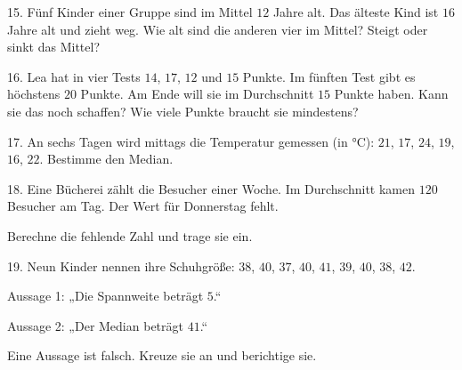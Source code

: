 \documentclass[11pt]{article}
\begin{document}
\begin{pfaufg}{}{15.}{}
Fünf Kinder einer Gruppe sind im Mittel $12$ Jahre alt. Das älteste Kind ist $16$ Jahre alt und zieht weg. Wie alt sind die anderen vier im Mittel? Steigt oder sinkt das Mittel?
\end{pfaufg}

\begin{pfaufg}{}{16.}{}
Lea hat in vier Tests $14$, $17$, $12$ und $15$ Punkte. Im fünften Test gibt es höchstens $20$ Punkte. Am Ende will sie im Durchschnitt $15$ Punkte haben. Kann sie das noch schaffen? Wie viele Punkte braucht sie mindestens?
\end{pfaufg}

\begin{pfaufg}{}{17.}{}
An sechs Tagen wird mittags die Temperatur gemessen (in °C): $21$, $17$, $24$, $19$, $16$, $22$. Bestimme den Median.
\end{pfaufg}

\begin{pfaufg}{}{18.}{}
Eine Bücherei zählt die Besucher einer Woche. Im Durchschnitt kamen $120$ Besucher am Tag. Der Wert für Donnerstag fehlt.\par\vspace{3pt} \par\vspace{3pt} Berechne die fehlende Zahl und trage sie ein.
\end{pfaufg}

\begin{pfaufg}{}{19.}{}
Neun Kinder nennen ihre Schuhgröße: $38$, $40$, $37$, $40$, $41$, $39$, $40$, $38$, $42$.\par Aussage 1: „Die Spannweite beträgt $5$.“\par Aussage 2: „Der Median beträgt $41$.“\par Eine Aussage ist falsch. Kreuze sie an und berichtige sie.\par\smallskip {}
\end{pfaufg}
\end{document}
